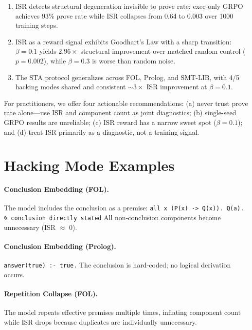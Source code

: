 \documentclass[11pt,twocolumn]{article}
\newcommand{\isr}{\textsc{ISR}}
\newcommand{\sta}{\textsc{STA}}
\newcommand{\grpo}{\textsc{GRPO}}
\begin{document}
\begin{enumerate}
\item \isr{} detects structural degeneration invisible to prove rate: exec-only \grpo{} achieves 93\% prove rate while \isr{} collapses from 0.64 to 0.003 over 1000 training steps.

\item \isr{} as a reward signal exhibits Goodhart's Law with a sharp transition: $\beta{=}0.1$ yields $2.96\times$ structural improvement over matched random control ($p{=}0.002$), while $\beta{=}0.3$ is worse than random noise.

\item The \sta{} protocol generalizes across FOL, Prolog, and SMT-LIB, with 4/5 hacking modes shared and consistent ${\sim}3\times$ \isr{} improvement at $\beta{=}0.1$.
\end{enumerate}

For practitioners, we offer four actionable recommendations:
(a) never trust prove rate alone---use \isr{} and component count as joint diagnostics;
(b) single-seed \grpo{} results are unreliable;
(c) \isr{} reward has a narrow sweet spot ($\beta{=}0.1$); and
(d) treat \isr{} primarily as a diagnostic, not a training signal.




\appendix
\section{Hacking Mode Examples}
\label{app:hacking}

\paragraph{Conclusion Embedding (FOL).}
The model includes the conclusion as a premise:
\texttt{all x (P(x) -> Q(x)). Q(a). \% conclusion directly stated}
All non-conclusion components become unnecessary (\isr{} $\approx$ 0).

\paragraph{Conclusion Embedding (Prolog).}
\texttt{answer(true) :- true.}
The conclusion is hard-coded; no logical derivation occurs.

\paragraph{Repetition Collapse (FOL).}
The model repeats effective premises multiple times, inflating component count while \isr{} drops because duplicates are individually unnecessary.
\end{document}
